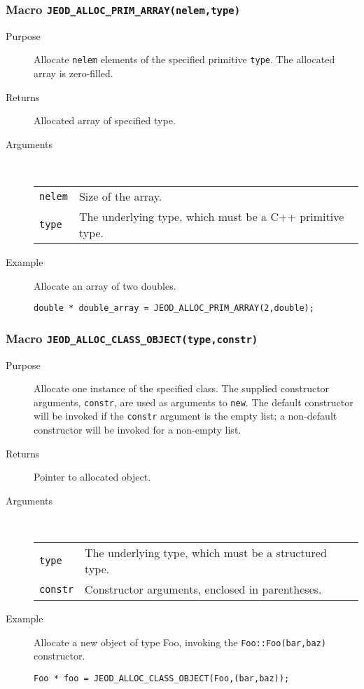 \subsubsection{Macro {\tt JEOD\_ALLOC\_PRIM\_ARRAY(nelem,type)}}
\begin{description}
\item[Purpose]
Allocate {\tt nelem} elements of the specified primitive {\tt type}.
The allocated array is zero-filled.
\item[Returns] Allocated array of specified type.
\item[Arguments] \ \\
\begin{tabular}{@{}ll}
{\tt nelem} &  Size of the array. \\
{\tt type} &  The underlying type, which must be a C++ primitive type.
\end{tabular}
\item[Example]
Allocate an array of two doubles.
\begin{verbatim}
double * double_array = JEOD_ALLOC_PRIM_ARRAY(2,double);
\end{verbatim}
\end{description}

\subsubsection{Macro {\tt JEOD\_ALLOC\_CLASS\_OBJECT(type,constr)}}
\begin{description}
\item[Purpose]
Allocate one instance of the specified class. The supplied
constructor arguments, {\tt constr}, are used as arguments to
{\tt new}.
The default constructor will be invoked if the {\tt constr}
argument is the empty list; a non-default constructor will be
invoked for a non-empty list.
\item[Returns] Pointer to allocated object.
\item[Arguments] \ \\
\begin{tabular}{@{}ll}
{\tt type} &  The underlying type, which must be a structured type. \\
{\tt constr} &  Constructor arguments, enclosed in parentheses.
\end{tabular}
\item[Example]
Allocate a new object of type Foo, invoking the
\verb|Foo::Foo(bar,baz)| constructor.
\begin{verbatim}
Foo * foo = JEOD_ALLOC_CLASS_OBJECT(Foo,(bar,baz));
\end{verbatim}
\end{description}


